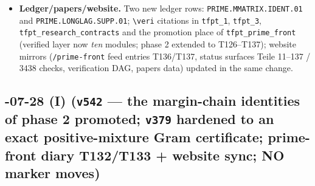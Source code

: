 \documentclass[11pt]{article}
\begin{document}
\begin{itemize}[leftmargin=1.5em]
Sandbox only for the probes: no ledger row, no marker move, not RH evidence.
\item \textbf{Ledger/papers/website.} Two new ledger rows:
\texttt{PRIME.\allowbreak MMATRIX.\allowbreak IDENT.01} and
\texttt{PRIME.\allowbreak LONGLAG.\allowbreak SUPP.01}; \texttt{\textbackslash veri} citations in \texttt{tfpt\_1},
\texttt{tfpt\_3}, \texttt{tfpt\_research\_contracts} and the promotion place of
\texttt{tfpt\_prime\_front} (verified layer now \emph{ten} modules; phase 2 extended to
T126--T137); website mirrors (\texttt{/prime-front} feed entries T136/T137, status surfaces Teile
11--137 / $3438$ checks, verification DAG, papers data) updated in the same change.
\end{itemize}

\subsection*{-07-28 (I) (\texttt{v542} --- the margin-chain identities of phase 2 promoted; \texttt{v379} hardened to an exact positive-mixture Gram certificate; prime-front diary T132/T133 + website sync; NO marker moves)}
\end{document}
